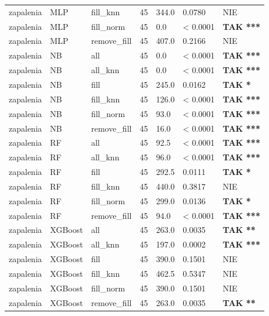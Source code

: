 \begin{table}[htbp]
\begin{tabular}{lllrlll}
zapalenia & MLP & fill_knn & 45 & 344.0 & 0.0780 & NIE \\
zapalenia & MLP & fill_norm & 45 & 0.0 & < 0.0001 & \textbf{TAK ***} \\
zapalenia & MLP & remove_fill & 45 & 407.0 & 0.2166 & NIE \\
zapalenia & NB & all & 45 & 0.0 & < 0.0001 & \textbf{TAK ***} \\
zapalenia & NB & all_knn & 45 & 0.0 & < 0.0001 & \textbf{TAK ***} \\
zapalenia & NB & fill & 45 & 245.0 & 0.0162 & \textbf{TAK *} \\
zapalenia & NB & fill_knn & 45 & 126.0 & < 0.0001 & \textbf{TAK ***} \\
zapalenia & NB & fill_norm & 45 & 93.0 & < 0.0001 & \textbf{TAK ***} \\
zapalenia & NB & remove_fill & 45 & 16.0 & < 0.0001 & \textbf{TAK ***} \\
zapalenia & RF & all & 45 & 92.5 & < 0.0001 & \textbf{TAK ***} \\
zapalenia & RF & all_knn & 45 & 96.0 & < 0.0001 & \textbf{TAK ***} \\
zapalenia & RF & fill & 45 & 292.5 & 0.0111 & \textbf{TAK *} \\
zapalenia & RF & fill_knn & 45 & 440.0 & 0.3817 & NIE \\
zapalenia & RF & fill_norm & 45 & 299.0 & 0.0136 & \textbf{TAK *} \\
zapalenia & RF & remove_fill & 45 & 94.0 & < 0.0001 & \textbf{TAK ***} \\
zapalenia & XGBoost & all & 45 & 263.0 & 0.0035 & \textbf{TAK **} \\
zapalenia & XGBoost & all_knn & 45 & 197.0 & 0.0002 & \textbf{TAK ***} \\
zapalenia & XGBoost & fill & 45 & 390.0 & 0.1501 & NIE \\
zapalenia & XGBoost & fill_knn & 45 & 462.5 & 0.5347 & NIE \\
zapalenia & XGBoost & fill_norm & 45 & 390.0 & 0.1501 & NIE \\
zapalenia & XGBoost & remove_fill & 45 & 263.0 & 0.0035 & \textbf{TAK **} \\
\bottomrule
\end{tabular}
\end{table}

